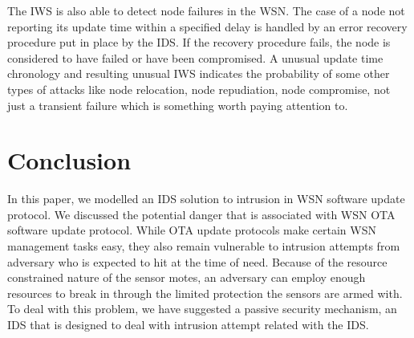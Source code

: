 \documentclass[conference]{IEEEtran}
\newcommand{\notedme}[1]{\raisebox{0pt}[0pt][0pt]{\pdfcomment[open=true,color=blue]{#1}}}
\begin{document}
The IWS is also able to detect node failures in the WSN.
The case of a node not reporting its update time within a specified delay is handled by an error recovery procedure put in place by the IDS.
If the recovery procedure fails, the node is considered to have failed or have been compromised.
A unusual update time chronology and resulting unusual IWS  indicates the probability of some other types of attacks like node relocation, node repudiation, node compromise, not just a transient failure which is something worth paying attention to.

\section{Conclusion}
\label{sec:concl}

In this paper, we modelled an IDS solution to intrusion in WSN software update protocol.
We discussed the potential danger that is associated with WSN OTA software update protocol.
While OTA update protocols make certain WSN management tasks easy, they also remain vulnerable to intrusion attempts from adversary who is expected to hit at the time of need.
Because of the resource constrained nature of the sensor motes, an adversary can employ enough resources to break in through the limited protection the sensors are armed with.
To deal with this problem, we have suggested a passive security mechanism, an IDS that is designed to deal with intrusion attempt related with the IDS.
\end{document}

